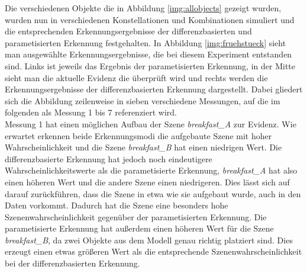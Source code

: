 Die verschiedenen Objekte die in Abbildung \ref{img:allobjects} gezeigt wurden, wurden nun in verschiedenen Konstellationen und Kombinationen simuliert und die entsprechenden Erkennungsergebnisse der differenzbasierten und parametisierten Erkennung festgehalten. In Abbildung \ref{img:fruehstueck} sieht man ausgewählte Erkennungsergebnisse, die bei diesem Experiment entstanden sind. Links ist jeweils das Ergebnis der parametisierten Erkennung, in der Mitte sieht man die aktuelle Evidenz die überprüft wird und rechts werden die Erkennungsergebnisse der differenzbasierten Erkennung dargestellt. Dabei gliedert sich die Abbildung zeilenweise in sieben verschiedene Messungen, auf die im folgenden als Messung 1 bis 7 referenziert wird.\smallskip\\
Messung 1 hat einen möglichen Aufbau der Szene \textit{breakfast\_A} zur Evidenz. Wie erwartet erkennen beide Erkennungsmodi die aufgebaute Szene mit hoher Wahrscheinlichkeit und die Szene \textit{breakfast\_B} hat einen niedrigen Wert. Die differenzbasierte Erkennung hat jedoch noch eindeutigere Wahrscheinlichkeitswerte als die parametisierte Erkennung, \textit{breakfast\_A} hat also einen höheren Wert und die andere Szene einen niedrigeren. Dies lässt sich auf darauf zurückführen, dass die Szene in etwa wie sie aufgebaut wurde, auch in den Daten vorkommt. Dadurch hat die Szene eine besonders hohe Szenenwahrscheinlichkeit gegenüber der parametisierten Erkennung. Die parametisierte Erkennung hat außerdem einen höheren Wert für die Szene  \textit{breakfast\_B}, da zwei Objekte aus dem Modell genau richtig platziert sind. Dies erzeugt einen etwas größeren Wert als die entsprechende Szenenwahrscheinlichkeit bei der differenzbasierten Erkennung.\smallskip\\
